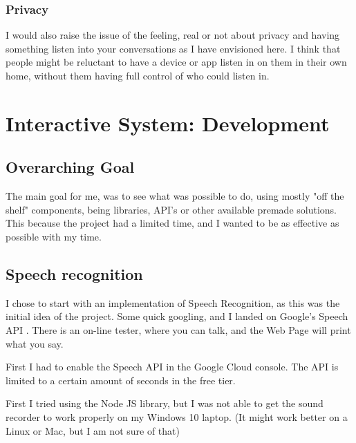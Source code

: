 \documentclass[11pt,fleqn]{book} %
\begin{document}
\subsection{Privacy}
I would also raise the issue of the feeling, real or not about privacy and having something listen into your conversations as I have envisioned here. I think that people might be reluctant to have a device or app listen in on them in their own home, without them having full control of who could listen in.

\chapter{Interactive System: Development}
\section{Overarching Goal}
The main goal for me, was to see what was possible to do, using mostly "off the shelf" components, being libraries, API's or other available premade solutions. This because the project had a limited time, and I wanted to be as effective as possible with my time.
\section{Speech recognition}
I chose to start with an implementation of Speech Recognition, as this was the initial idea of the project.
Some quick googling, and I landed on Google's Speech API \cite{GoogleCloudPlatformSpeechPlatform}. There is an on-line tester, where you can talk, and the Web Page will print what you say.

First I had to enable the Speech API in the Google Cloud console. The API is limited to a certain amount of seconds in the free tier.

First I tried using the Node JS library, but I was not able to get the sound recorder to work properly on my Windows 10 laptop. (It might work better on a Linux or Mac, but I am not sure of that)
\end{document}
